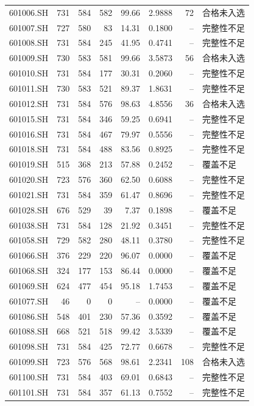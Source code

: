 \documentclass[10pt,a4paper]{article}
\begin{document}
\begin{longtable}{lrrr r r r l}
601006.SH & 731 & 584 & 582 & 99.66 & 2.9888 & 72 & 合格未入选\\
601007.SH & 727 & 580 & 83 & 14.31 & 0.1800 & -- & 完整性不足\\
601008.SH & 731 & 584 & 245 & 41.95 & 0.4741 & -- & 完整性不足\\
601009.SH & 730 & 583 & 581 & 99.66 & 3.5873 & 56 & 合格未入选\\
601010.SH & 731 & 584 & 177 & 30.31 & 0.2060 & -- & 完整性不足\\
601011.SH & 730 & 583 & 521 & 89.37 & 1.8631 & -- & 完整性不足\\
601012.SH & 731 & 584 & 576 & 98.63 & 4.8556 & 36 & 合格未入选\\
601015.SH & 731 & 584 & 346 & 59.25 & 0.6941 & -- & 完整性不足\\
601016.SH & 731 & 584 & 467 & 79.97 & 0.5556 & -- & 完整性不足\\
601018.SH & 731 & 584 & 488 & 83.56 & 0.8925 & -- & 完整性不足\\
601019.SH & 515 & 368 & 213 & 57.88 & 0.2452 & -- & 覆盖不足\\
601020.SH & 723 & 576 & 360 & 62.50 & 0.6088 & -- & 完整性不足\\
601021.SH & 731 & 584 & 359 & 61.47 & 0.8696 & -- & 完整性不足\\
601028.SH & 676 & 529 & 39 & 7.37 & 0.1898 & -- & 覆盖不足\\
601038.SH & 731 & 584 & 128 & 21.92 & 0.3451 & -- & 完整性不足\\
601058.SH & 729 & 582 & 280 & 48.11 & 0.3780 & -- & 完整性不足\\
601066.SH & 376 & 229 & 220 & 96.07 & 0.0000 & -- & 覆盖不足\\
601068.SH & 324 & 177 & 153 & 86.44 & 0.0000 & -- & 覆盖不足\\
601069.SH & 624 & 477 & 454 & 95.18 & 1.7453 & -- & 覆盖不足\\
601077.SH & 46 & 0 & 0 & -- & 0.0000 & -- & 覆盖不足\\
601086.SH & 548 & 401 & 230 & 57.36 & 0.3592 & -- & 覆盖不足\\
601088.SH & 668 & 521 & 518 & 99.42 & 3.5339 & -- & 覆盖不足\\
601098.SH & 731 & 584 & 425 & 72.77 & 0.6678 & -- & 完整性不足\\
601099.SH & 723 & 576 & 568 & 98.61 & 2.2341 & 108 & 合格未入选\\
601100.SH & 731 & 584 & 403 & 69.01 & 0.6843 & -- & 完整性不足\\
601101.SH & 731 & 584 & 357 & 61.13 & 0.7552 & -- & 完整性不足\\

\end{longtable}
\end{document}
